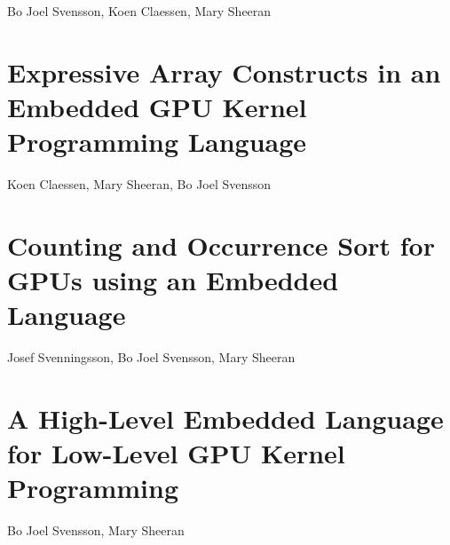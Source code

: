 \documentclass[a4paper]{book}
\newcommand{\paperEXPRESSIVE}{Expressive Array Constructs in an Embedded GPU Kernel Programming Language}
\newcommand{\paperCSORT}{Counting and Occurrence Sort for GPUs using an Embedded Language}
\newcommand{\paperHL}{A High-Level Embedded Language for Low-Level GPU Kernel Programming}
\begin{document}
\begin{center} 
Bo Joel Svensson, Koen Claessen, Mary Sheeran
\end{center}




% 
\cleardoublepage 

\section{\paperEXPRESSIVE}
\label{sec:paperEXPRESSIVE}

\begin{center} 
Koen Claessen, Mary Sheeran, Bo Joel Svensson
\end{center}



% 
\cleardoublepage 

\section{\paperCSORT}
\label{sec:paperCSORT}

\begin{center} 
Josef Svenningsson, Bo Joel Svensson, Mary Sheeran 
\end{center}





% 
\cleardoublepage 


\section{\paperHL}
\label{sec:paperHL}

\begin{center} 
Bo Joel Svensson, Mary Sheeran
\end{center}
\end{document}
